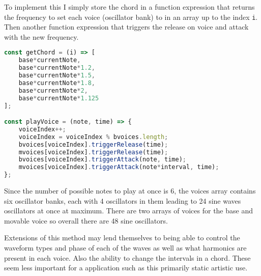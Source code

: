 To implement this I simply store the chord in a function expression that returns
the frequency to set each voice (oscillator bank) to in an array up to the index
\verb|i|. Then another function expression that triggers the release on voice
and attack with the new frequency.

\begin{lstlisting}[language=JavaScript]
const getChord = (i) => [
    base*currentNote,
    base*currentNote*1.2,
    base*currentNote*1.5,
    base*currentNote*1.8,
    base*currentNote*2,
    base*currentNote*1.125
];

const playVoice = (note, time) => {
    voiceIndex++;
    voiceIndex = voiceIndex % bvoices.length;
    bvoices[voiceIndex].triggerRelease(time);
    mvoices[voiceIndex].triggerRelease(time);
    bvoices[voiceIndex].triggerAttack(note, time);
    mvoices[voiceIndex].triggerAttack(note*interval, time);
};
\end{lstlisting}

Since the number of possible notes to play at once is 6, the voices array
contains six oscillator banks, each with 4 oscillators in them leading to 24
sine waves oscillators at once at maximum. There are two arrays of voices for
the base and movable voice so overall there are 48 sine oscillators.

Extensions of this method may lend themselves to being able to control the
waveform types and phase of each of the waves as well as what harmonics are
present in each voice. Also the ability to change the intervals in a chord.
These seem less important for a application such as this primarily static
artistic use.
